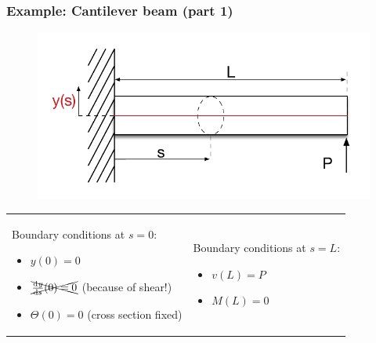 \begin{frame}
  \frametitle{Example: Cantilever beam (part 1)}
  
  \begin{figure}
    \centering
    \includegraphics[width=16cm, keepaspectratio=true]{sections/traditional_beams/images/EulerCanitleverExample1part1}
  \end{figure}
  
  \begin{tabularx}{\linewidth}{XX}
    {
      Boundary conditions at $s=0$:
      \begin{itemize}
        \item $y(0) = 0$
        \item $\xcancel{\od{y}{s}(0) = 0}$ (because of shear!)
        \item $\Theta(0) = 0$ (cross section fixed)
      \end{itemize}
    } & {
      Boundary conditions at $s=L$:
      \begin{itemize}
        \item $v(L) = P$
        \item $M(L) = 0$
      \end{itemize}
    }
  \end{tabularx}
\end{frame}


